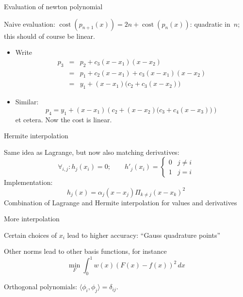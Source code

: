  {Evaluation of newton polynomial}

Naive evaluation:
  $\mathop{\mathrm{cost}}(p_{n+1}(x))=2n+\mathop{\mathrm{cost}}(p_n(x))$:
  quadratic in~$n$; this should of course be linear.
\begin{itemize}
\item Write
\begin{eqnarray*}p_3&=&p_2+c_3(x-x_1)(x-x_2)\\
&=&p_1+c_2(x-x_1)+c_3(x-x_1)(x-x_2)\\
&=&y_1+(x-x_1)\bigl(c_2+c_3(x-x_2)\bigr)
\end{eqnarray*}
\item Similar:
\[ p_4=y_1+(x-x_1)\left(c_2+(x-x_2)\bigl(c_3+c_4(x-x_3)\bigr)\right)\]
et cetera. Now the cost is linear.
\end{itemize}


 {Hermite interpolation}

  Same idea as Lagrange, but now also matching derivatives:
  \[ \forall_{i,j}\colon h_j(x_i)=0; \qquad
  h'_j(x_i)=
  \begin{cases}
    0&j\not=i\\ 1&j=i
  \end{cases}
  \]
  Implementation: \[ h_j(x)=\alpha_j(x-x_j)\Pi_{k\not=j}(x-x_k)^2 \]
  Combination of Lagrange and Hermite interpolation for values and derivatives


 {More interpolation}

  Certain choices of $x_i$ lead to higher accuracy: ``Gauss quadrature points''

  Other norms lead to other basis functions, for instance
  \[ \min_F \int_0^1 w(x)(F(x)-f(x))^2\,dx \]

  Orthogonal polynomials: $\langle \phi_i,\phi_j\rangle=\delta_{ij}$.

